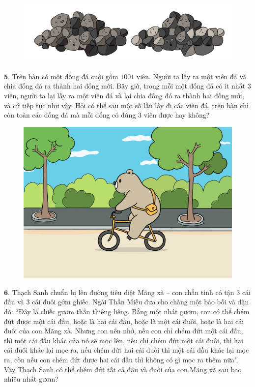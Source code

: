 \begin{multicols}{2}
\begin{figure}[H]
		\captionsetup{labelformat= empty, justification=centering}
		\includegraphics[width=1\linewidth]{bai5}
		\vspace*{-15pt}
	\end{figure}
	$\pmb{5.}$ Trên bàn có một đống đá cuội gồm $1001$ viên. Người ta lấy ra một viên đá và chia đống đá ra thành hai đống mới. Bây giờ, trong mỗi một đống đá có ít nhất $3$ viên, người ta lại lấy ra một viên đá và lại chia đống đó ra thành hai đống mới, và cứ tiếp tục như vậy. Hỏi có thể sau một số lần lấy đi các viên đá, trên bàn chỉ còn toàn các đống đá mà mỗi đống có đúng $3$ viên được hay không?
	\begin{figure}[H]
		\centering
		\vspace*{-5pt}
		\captionsetup{labelformat= empty, justification=centering}
		\includegraphics[width=1\linewidth]{bai4}
		\vspace*{-15pt}
	\end{figure}
	$\pmb{6.}$ Thạch Sanh chuẩn bị lên đường tiêu diệt Mãng xà -- con chằn tinh có tận $3$ cái đầu và $3$ cái đuôi gớm ghiếc. Ngài Thần Miếu đưa cho chàng một bảo bối và dặn dò: ``Đây là chiếc gươm thần thiêng liêng. Bằng một nhát gươm, con có thể chém đứt được một cái đầu, hoặc là hai cái đầu, hoặc là một cái đuôi, hoặc là hai cái đuôi của con Mãng xà. Nhưng con nên nhớ, nếu con chỉ chém đứt một cái đầu, thì một cái đầu khác của nó sẽ mọc lên, nếu chỉ chém đứt một cái đuôi, thì hai cái đuôi khác lại mọc ra, nếu chém đứt hai cái đuôi thì một cái đầu khác lại mọc ra, còn nếu con chém đứt được hai cái đầu thì không có gì mọc ra thêm nữa". Vậy Thạch Sanh có thể chém đứt tất cả đầu và đuôi của con Mãng xà sau bao nhiêu nhát gươm?

\end{multicols}
